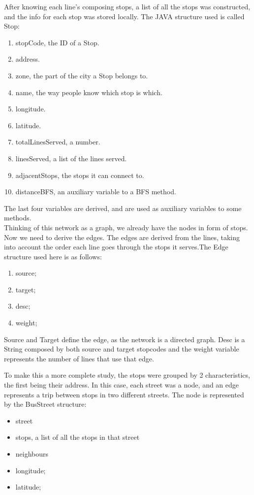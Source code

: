 \documentclass[12pt]{article}
\begin{document}
\begin{multicols}{2}
After knowing each line's composing stops, a list of all the stops was constructed, and the info for each stop was stored locally. The JAVA structure used is called Stop:
\begin{enumerate}
	\item stopCode, the ID of a Stop.
	\item address.
	\item zone, the part of the city a Stop belongs to.
	\item name, the way people know which stop is which.
	\item longitude.
	\item latitude.
	\item totalLinesServed, a number.
	\item linesServed, a list of the lines served.
	\item adjacentStops, the stops it can connect to.
	\item distanceBFS, an auxiliary variable to a BFS method.
\end{enumerate}

The last four variables are derived, and are used as auxiliary variables to some methods.\\
Thinking of this network as a graph, we already have the nodes in form of stops. Now we need to derive the edges. The edges are derived from the lines, taking into account the order each line goes through the stops it serves.The Edge structure used here is as follows:
\begin{enumerate}
	\item source;
	\item target;
	\item desc;
	\item weight;
\end{enumerate}

Source and Target define the edge, as the network is a directed graph. Desc is a String composed by both source and target stopcodes and the weight variable represents the number of lines that use that edge. 

To make this a more complete study, the stops were grouped by 2 characteristics, the first being their address. In this case, each street was a node, and an edge represents a trip between stops in two different streets. The node is represented by the BusStreet structure:
\begin{itemize}
	\item street
	\item stops, a list of all the stops in that street
	\item neighbours
	\item longitude;
	\item latitude;
\end{itemize}


\end{multicols}
\end{document}
